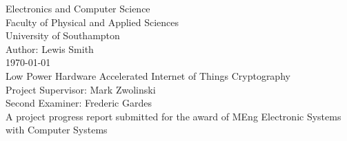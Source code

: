 \documentclass[12pt,twoside,a4paper]{report}
\begin{document}
    
    \begin{titlepage}
    \begin{center}
        \Huge
        Electronics and Computer Science
        \\Faculty of Physical and Applied Sciences
        \\University of Southampton
        \Large
        \\[4cm]Author: Lewis Smith
        \\[1cm]\today
        \Huge
        \\[2cm]Low Power Hardware Accelerated Internet of Things Cryptography
        \large
        \\[4cm]Project Supervisor: Mark Zwolinski
        \\Second Examiner: 	Frederic Gardes
        \\[4cm]A project progress report submitted for the award of MEng Electronic Systems with Computer Systems
        
    \end{center}
    \end{titlepage}
    \thispagestyle{empty}
    \cleardoublepage
    
    \begin{abstract}
    
    This project aims to develop a FPGA system that can encrypt and decrypt data that is being used and transmitted between `Internet of Things' devices. It does this using the SIMON algorithm that was selected from many during the research stage because of its flexibility and its lightweight characteristics. The FPGA development was done in the System Verilog language and simulated using ModelSim before being synthesised in Quartus Prime. A software version was also developed in C for comparison with the hardware version. Both versions will be compared with similar projects found in literature in terms of data throughput, power consumption and circuit area. So far the software version is ready for testing and the hardware is working in simulation but not tested on a FPGA.
    
    \end{abstract}
    
    \tableofcontents
    
\end{document}
